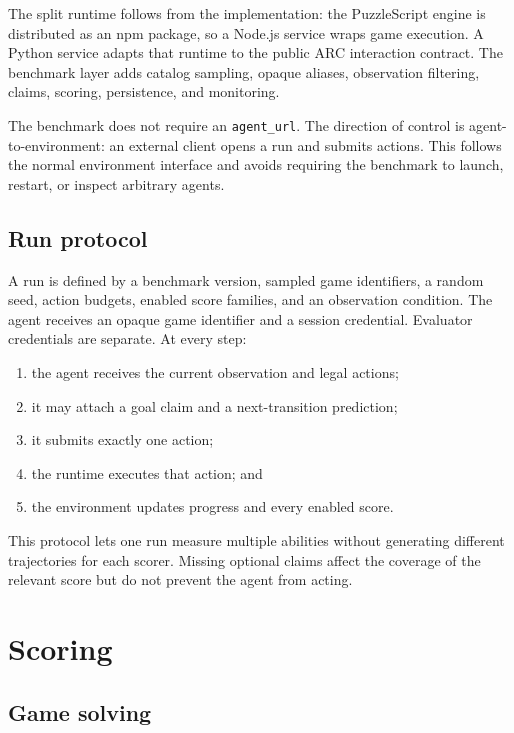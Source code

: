 \documentclass[sigconf,nonacm]{acmart}
\begin{document}
The split runtime follows from the implementation: the PuzzleScript engine is
distributed as an npm package, so a Node.js service wraps game execution. A
Python service adapts that runtime to the public ARC interaction contract. The
benchmark layer adds catalog sampling, opaque aliases, observation filtering,
claims, scoring, persistence, and monitoring.

The benchmark does not require an \texttt{agent\_url}. The direction of control
is agent-to-environment: an external client opens a run and submits actions.
This follows the normal environment interface and avoids requiring the
benchmark to launch, restart, or inspect arbitrary agents.

\subsection{Run protocol}

A run is defined by a benchmark version, sampled game identifiers, a random
seed, action budgets, enabled score families, and an observation condition.
The agent receives an opaque game identifier and a session credential.
Evaluator credentials are separate. At every step:

\begin{enumerate}
  \item the agent receives the current observation and legal actions;
  \item it may attach a goal claim and a next-transition prediction;
  \item it submits exactly one action;
  \item the runtime executes that action; and
  \item the environment updates progress and every enabled score.
\end{enumerate}

This protocol lets one run measure multiple abilities without generating
different trajectories for each scorer. Missing optional claims affect the
coverage of the relevant score but do not prevent the agent from acting.

\section{Scoring}

\subsection{Game solving}
\end{document}
